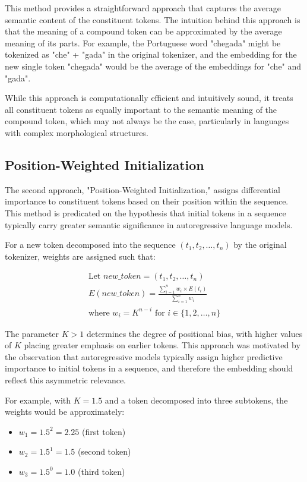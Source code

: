 This method provides a straightforward approach that captures the average semantic content of the constituent tokens. The intuition behind this approach is that the meaning of a compound token can be approximated by the average meaning of its parts. For example, the Portuguese word "chegada" might be tokenized as "che" + "gada" in the original tokenizer, and the embedding for the new single token "chegada" would be the average of the embeddings for "che" and "gada".

While this approach is computationally efficient and intuitively sound, it treats all constituent tokens as equally important to the semantic meaning of the compound token, which may not always be the case, particularly in languages with complex morphological structures.

\subsection{Position-Weighted Initialization}
The second approach, "Position-Weighted Initialization," assigns differential importance to constituent tokens based on their position within the sequence. This method is predicated on the hypothesis that initial tokens in a sequence typically carry greater semantic significance in autoregressive language models.

For a new token decomposed into the sequence $(t_1, t_2, \ldots, t_n)$ by the original tokenizer, weights are assigned such that:

$$
\begin{array}{c}
    \text{Let } new\_token = (t_1, t_2, \ldots, t_n) \\
    E(new\_token) = \frac{\sum_{i=1}^{n} w_i \times E(t_i)}{\sum_{i=1}^{n} w_i} \\
    \text{where } w_i = K^{n-i} \text{ for } i \in \{1,2,\ldots,n\}
\end{array}
$$

The parameter $K > 1$ determines the degree of positional bias, with higher values of $K$ placing greater emphasis on earlier tokens. This approach was motivated by the observation that autoregressive models typically assign higher predictive importance to initial tokens in a sequence, and therefore the embedding should reflect this asymmetric relevance.

For example, with $K = 1.5$ and a token decomposed into three subtokens, the weights would be approximately:
\begin{itemize}
    \item $w_1 = 1.5^2 = 2.25$ (first token)
    \item $w_2 = 1.5^1 = 1.5$ (second token)
    \item $w_3 = 1.5^0 = 1.0$ (third token)
\end{itemize}

